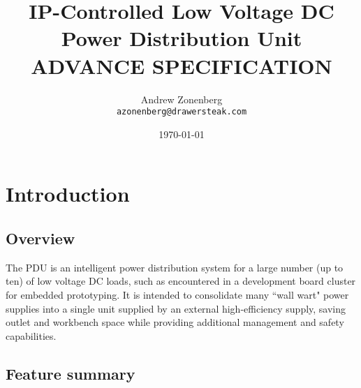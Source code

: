 \documentclass[twocolumn]{article}
\begin{document}
\title{IP-Controlled Low Voltage DC Power Distribution Unit\\ADVANCE SPECIFICATION}
\author{Andrew Zonenberg\\
	\texttt{azonenberg@drawersteak.com}}
\date{\today}
\maketitle

\pagestyle{fancy}

\setcounter{tocdepth}{3}
\tableofcontents

\section{Introduction}

\subsection{Overview}
The PDU is an intelligent power distribution system for a large number (up to ten) of low voltage DC loads, such as 
encountered in a development board cluster for embedded prototyping. It is intended to consolidate many ``wall wart" 
power supplies into a single unit supplied by an external high-efficiency supply, saving outlet and workbench space 
while providing additional management and safety capabilities.

\subsection{Feature summary}
\end{document}
